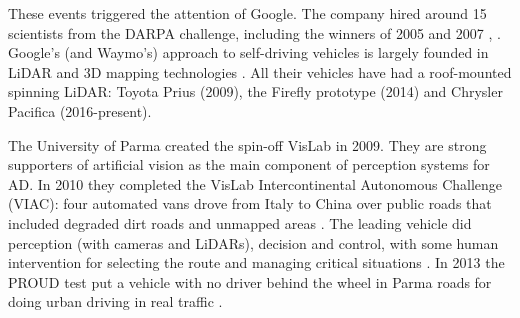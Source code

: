 %

These events triggered the attention of Google. 
The company hired around 15 scientists from the DARPA challenge, 
including the winners of 2005 and 2007 \cite{Montemerlo2008}, 
\cite{Levinson2011}. Google's (and Waymo's) approach to self-driving vehicles
is largely founded in LiDAR and 3D mapping technologies \cite{Chapell2016}. 
All their vehicles have had a roof-mounted spinning LiDAR: Toyota Prius (2009),
the Firefly prototype (2014) and Chrysler Pacifica (2016-present).

The University of Parma created the spin-off VisLab in 2009. 
They are strong supporters of artificial vision as the main component of 
perception systems for AD. 
In 2010 they completed the VisLab Intercontinental Autonomous 
Challenge (VIAC): four automated vans drove from Italy to China over public 
roads that included degraded dirt roads and unmapped areas \cite{Bertozzi2011}.
The leading vehicle did perception (with cameras and LiDARs), decision and 
control, with some human intervention for selecting the route and managing 
critical situations \cite{Broggi2012}. 
In 2013 the PROUD test put a vehicle with no driver behind the wheel in Parma 
roads for doing urban driving in real traffic \cite{Broggi2013}. 
 
